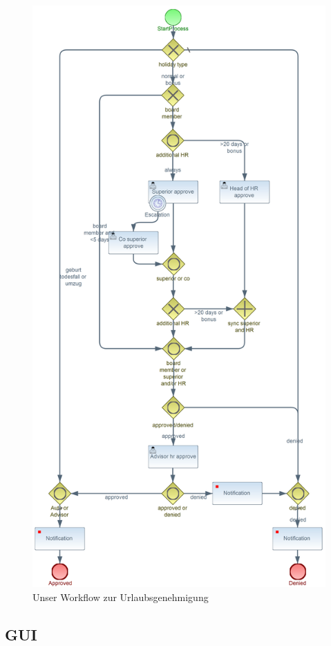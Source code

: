 \begin{figure}[H]
\centering
\includegraphics[width=0.75\linewidth]{Bilder/Urlaubsantrag}
\caption{Unser Workflow zur Urlaubsgenehmigung}
\label{fig:Urlaubsantrag}
\end{figure}




\subsection{GUI}